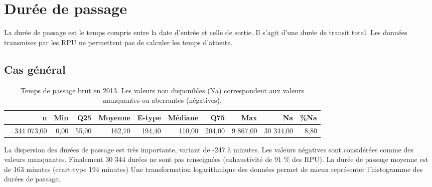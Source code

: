 \documentclass[12pt,english,french,twoside]{book}\usepackage[]{graphicx}\usepackage[]{color}
\begin{document}
\newpage
\chapter{Durée de passage}


La durée de passage est le temps compris entre la date d'entrée et celle de sortie. Il s'agit d'une durée de transit total. Les données transmises par les RPU ne permettent pas de calculer les temps d'attente.


\section{Cas général}

\begin{table}[ht]
\centering
\begin{tabular}{rrrrrrrrrrr}
  \hline
 & n & Min & Q25 & Moyenne & E-type & Médiane & Q75 & Max & Na & \%Na \\ 
  \hline
 & 344 073,00 & 0,00 & 55,00 & 162,70 & 194,40 & 110,00 & 204,00 & 9 867,00 & 30 344,00 & 8,80 \\ 
   \hline
\end{tabular}
\caption[temps de passage brut]{Temps de passage brut en 2013. Les valeurs non disponibles (Na) correspondent aux valeurs manquantes ou aberrantes (négatives).} 
\label{lab:temps_brut}
\end{table}


La dispersion des durées de passage est très importante, variant de -247 à  minutes. Les valeurs négatives sont considérées comme des valeurs manquantes. 
Finalement 30 344 durées ne sont pas renseignées (exhaustivité de 91 \% des RPU). 
La durée de passage moyenne est de 163 minutes (ecart-type 194 minutes)
Une transformation logarithmique des données permet de mieux représenter l'histogramme des durées de passage. 
\end{document}
